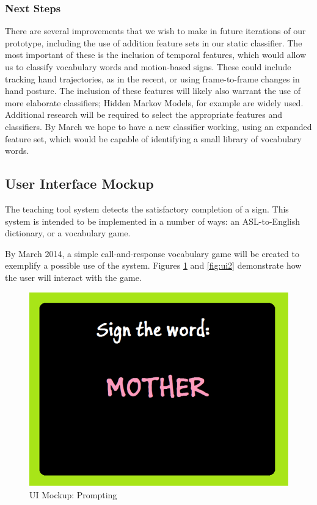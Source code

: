 \documentclass[12pt]{article}
\begin{document}
\subsubsection{Next Steps}
There are several improvements that we wish to make in future iterations of our prototype, including the use of addition feature sets in our static classifier. The most important of these is the inclusion of temporal features, which would allow us to classify vocabulary words and motion-based signs. These could include tracking hand trajectories, as in the recent, or using frame-to-frame changes in hand posture. The inclusion of these features will likely also warrant the use of more elaborate classifiers; Hidden Markov Models, for example are widely used. Additional research will be required to select the appropriate features and classifiers. By March we hope to have a new classifier working, using an expanded feature set, which would be capable of identifying a small library of vocabulary words.

\subsection{User Interface Mockup}
The teaching tool system detects the satisfactory completion of a sign. This system is intended to be implemented in a number of ways: an ASL-to-English dictionary, or a vocabulary game.

By March 2014, a simple call-and-response vocabulary game will be created to exemplify a possible use of the system. Figures \ref{fig:ui1} and \ref{fig:ui2} demonstrate how the user will interact with the game.

\begin{figure}[H]
  \centering
  \includegraphics[scale=1]{Mother.png}
  \caption{UI Mockup: Prompting }
  \label{fig:ui1}
\end{figure}
\end{document}
